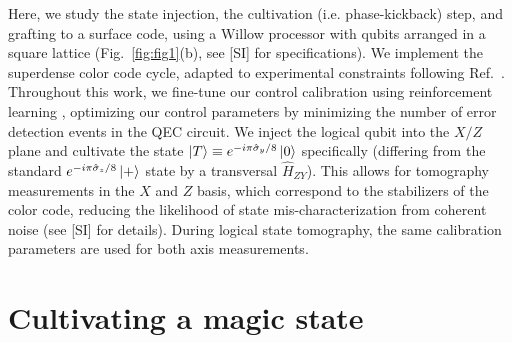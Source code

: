 \documentclass[%
 reprint,
 amsmath,amssymb,
 aps,
]{revtex4-2}
\begin{document}
Here, we study the state injection, the cultivation (i.e. phase-kickback) step, and grafting to a surface code, using a Willow processor with qubits arranged in a square lattice (Fig.~\ref{fig:fig1}(b), see [SI] for specifications). We implement the superdense color code cycle, adapted to experimental constraints following Ref.~\cite{lacroix_scaling_2025}. Throughout this work, we fine-tune our control calibration using reinforcement learning \cite{sivak_reinforcement_2025}, optimizing our control parameters by minimizing the number of error detection events in the QEC circuit. We inject the logical qubit into the $X/Z$ plane and cultivate the state $\ket{T} \equiv e^{-i \pi \hat{\sigma}_y / 8} \ket{0}$ specifically (differing from the standard $e^{-i \pi \hat{\sigma}_z/8} \ket{+}$ state by a transversal $\hat{H}_{ZY}$). This allows for tomography measurements in the $X$ and $Z$ basis, which correspond to the stabilizers of the color code, reducing the likelihood of state mis-characterization from coherent noise (see [SI] for details). During logical state tomography, the same calibration parameters are used for both axis measurements.

\section{Cultivating a magic state}
\end{document}
